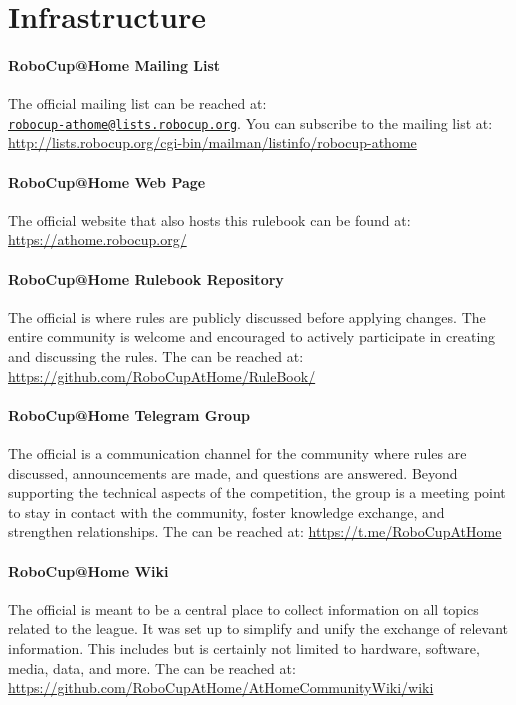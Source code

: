 \section{Infrastructure}
\label{sec:introduction:infrastructure}
\paragraph{RoboCup@Home Mailing List}
\label{sec:introduction:mailinglist}
The official \AtHome{} mailing list can be reached at:\\
\href{mailto:robocup-athome@lists.robocup.org}{\small\texttt{robocup-athome@lists.robocup.org}}. You can subscribe to the mailing list at: {\small\url{http://lists.robocup.org/cgi-bin/mailman/listinfo/robocup-athome}}

\paragraph{RoboCup@Home Web Page}
\label{sec:introduction:webpage}
The official \AtHome{} website that also hosts this rulebook can be found at: {\small\url{https://athome.robocup.org/}}

\paragraph{RoboCup@Home Rulebook Repository}
\label{sec:introduction:repo}
The official \AtHome{} \RR{} is where rules are publicly discussed before applying changes.
The entire \AtHome{} community is welcome and encouraged to actively participate in creating and discussing the rules. The \RR{} can be reached at: {\small\url{https://github.com/RoboCupAtHome/RuleBook/}}

\paragraph{RoboCup@Home Telegram Group}
\label{sec:introduction:telegramgroup}
The official \AtHome{} \TG{} is a communication channel for the \AtHome{} community where rules are discussed, announcements are made, and questions are answered.
Beyond supporting the technical aspects of the competition, the group is a meeting point to stay in contact with the community, foster knowledge exchange, and strengthen relationships.
The \TG{} can be reached at: {\small\url{https://t.me/RoboCupAtHome}}

\paragraph{RoboCup@Home Wiki}
\label{sec:introduction:wiki}
The official \AtHome{} \WIKI{} is meant to be a central place to collect information on all topics related to the \AtHome league. It was set up to simplify and unify the exchange of relevant information.
This includes but is certainly not limited to hardware, software, media, data, and more.
The \WIKI{} can be reached at: {\small\url{https://github.com/RoboCupAtHome/AtHomeCommunityWiki/wiki}}
